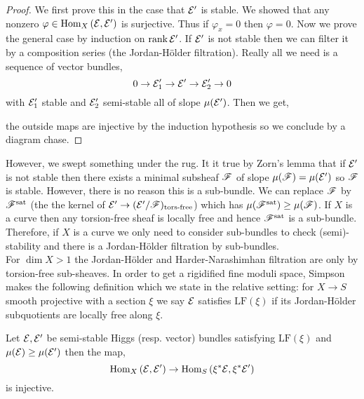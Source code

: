 \documentclass[12pt]{article}
\begin{document}
\begin{proof}
We first prove this in the case that $\mathcal{E}'$ is stable. We showed that any nonzero $\varphi \in \mathrm{Hom}_{X} \left( \mathcal{E}, \mathcal{E}' \right)$ is surjective. Thus if $\varphi_x = 0$ then $\varphi = 0$. Now we prove the general case by induction on $\operatorname{\mathrm{rank}}{\mathcal{E}'}$. If $\mathcal{E}'$ is not stable then we can filter it by a composition series (the Jordan-H\"{o}lder filtration). Really all we need is a sequence of vector bundles,
\[ 0 \to \mathcal{E}'_1 \to \mathcal{E}' \to \mathcal{E}'_2 \to 0 \] 
with $\mathcal{E}'_1$ stable and $\mathcal{E}'_2$ semi-stable all of slope $\mu(\mathcal{E}')$. Then we get,
\begin{center}
\end{center}
the outside maps are injective by the induction hypothesis so we conclude by a diagram chase.
\end{proof}

\newcommand{\sat}{\mathrm{sat}}
\newcommand{\LF}{\mathrm{LF}}

However, we swept something under the rug. It it true by Zorn's lemma that if $\mathcal{E}'$ is not stable then there exists a minimal subsheaf $\mathscr{F}$ of slope $\mu(\mathscr{F}) = \mu(\mathcal{E}')$ so $\mathscr{F}$ is stable. However, there is no reason this is a sub-bundle. We can replace $\mathscr{F}$ by $\F^{\sat}$ (the the kernel of $\mathcal{E}' \to (\mathcal{E}'/\mathscr{F})_{\text{tors-free}}$) which has $\mu(\F^{\sat}) \ge \mu(\F)$. If $X$ is a curve then any torsion-free sheaf is locally free and hence $\F^{\sat}$ is a sub-bundle. Therefore, if $X$ is a curve we only need to consider sub-bundles to check (semi)-stability and there is a Jordan-H\"{o}lder filtration by sub-bundles.
\bigskip\\
For $\dim{X} > 1$ the Jordan-H\"{o}lder and Harder-Narashimhan filtration are only by torsion-free sub-sheaves. In order to get a rigidified fine moduli space, Simpson makes the following definition which we state in the relative setting: for $X \to S$ smooth projective with a section $\xi$ we say $\mathcal{E}$ satisfies $\LF(\xi)$ if its Jordan-H\"{o}lder subquotients are locally free along $\xi$. 

\begin{prop}
Let $\mathcal{E}, \mathcal{E}'$ be semi-stable Higgs (resp. vector) bundles satisfying $\LF(\xi)$ and $\mu(\mathcal{E}) \ge \mu(\mathcal{E}')$ then the map,
\[ \mathrm{Hom}_{X} \left( \mathcal{E}, \mathcal{E}' \right) \to \mathrm{Hom}_{S} \left( \xi^* \mathcal{E}, \xi^* \mathcal{E}' \right) \]
is injective.
\end{prop}
\end{document}
